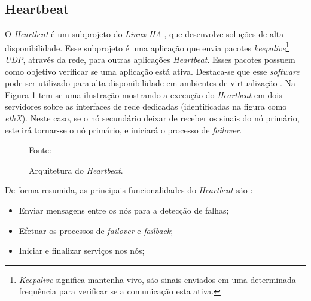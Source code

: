 
\subsection{Heartbeat}
\label{section:heartbeat}
O \textit{Heartbeat} é um subprojeto do \textit{Linux-HA} \cite{linuxha}, que desenvolve soluções de alta disponibilidade.
Esse subprojeto é uma aplicação que envia pacotes \textit{keepalive}\footnote{\textit{Keepalive} significa mantenha vivo, são sinais 
enviados em uma determinada frequência para verificar se a comunicação esta ativa.} \textit{\ac{UDP}}, 
através da rede, para outras aplicações \textit{Heartbeat}. Esses pacotes possuem como objetivo verificar se uma aplicação está ativa.
Destaca-se que esse \textit{software} pode ser utilizado para alta disponibilidade em ambientes de virtualização \cite{reis2009}.
Na Figura \ref{fig:heartbeat} tem-se uma ilustração mostrando a execução do \textit{Heartbeat} em dois servidores sobre as interfaces de rede 
dedicadas (identificadas na figura como \textit{ethX}).
Neste caso, se o nó secundário deixar de receber os sinais do nó primário, este irá tornar-se o nó primário, e iniciará o processo de 
\textit{failover}. 
\begin{figure}[h!]
 \centering
 \caption{Arquitetura do \textit{Heartbeat}.}
 Fonte: \citet{zaminhani2008}
 \label{fig:heartbeat}
\end{figure}

De forma resumida, as principais funcionalidades do \textit{Heartbeat} são \cite{clusterlabs}:
\begin{itemize}
 \item Enviar mensagens entre os nós para a detecção de falhas;
 \item Efetuar os processos de \textit{failover} e \textit{failback};
 \item Iniciar e finalizar serviços nos nós;
\end{itemize}

